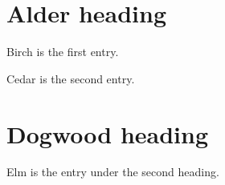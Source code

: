 \documentclass{resume}
\begin{document}
\section{Alder heading}
Birch is the first entry.

Cedar is the second entry.

\section{Dogwood heading}
Elm is the entry under the second heading.
\end{document}
